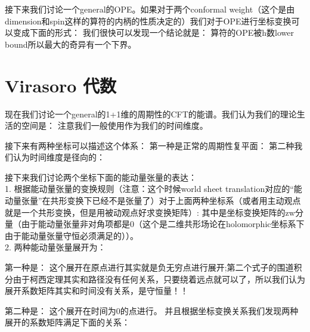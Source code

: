 \line
接下来我们讨论一个general的OPE。如果对于两个conformal weight（这个是由dimension和spin这样的算符的内柄的性质决定的）我们对于OPE进行坐标变换可以变成下面的形式：
我们很快可以发现一个结论就是：
算符的OPE被h数lower bound所以最大的奇异有一个下界。

\newpage
\section{Virasoro 代数}
现在我们讨论一个general的1+1维的周期性的CFT的能谱。我们认为我们的理论生活的空间是：
注意我们一般使用作为我们的时间维度。

接下来有两种坐标可以描述这个体系：
第一种是正常的周期性复平面：
第二种我们认为时间维度是径向的：

接下来我们讨论两个坐标下面的能动量张量的表达：
~\\

1. 根据能动量张量的变换规则（注意：这个时候world sheet translation对应的“能动量张量”在共形变换下已经不是张量了）对于上面两种坐标系（或者用主动观点就是一个共形变换，但是用被动观点好求变换矩阵）:
其中是坐标变换矩阵的zw分量（由于能动量张量非对角项都是0（这个是二维共形场论在holomorphic坐标系下由于能动量张量守恒必须满足的））。
~\\

2. 两种能动量张量展开为：

第一种是：
这个展开在原点进行其实就是负无穷点进行展开;第二个式子的围道积分由于柯西定理其实和路径没有任何关系，只要绕着远点就可以了，所以我们认为展开系数矩阵其实和时间没有关系，是守恒量！！

第二种是：
这个展开在时间为0的点进行。
并且根据坐标变换关系我们发现两种展开的系数矩阵满足下面的关系：
~\\

